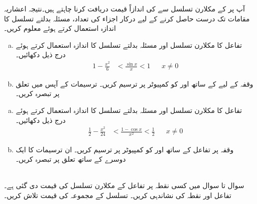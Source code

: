 آپ  پر  کے مکلارن تسلسل سے  کی اندازاً قیمت دریافت کرنا چاہتے ہیں۔نتیجہ  اعشاریہ مقامات تک درست حاصل کرنے کے لیے درکار اجزاء کی تعداد، مسئلہ بدلتے تسلسل کا اندازہ استعمال کرتے ہوئے معلوم کریں۔ 
\begin{enumerate}[a.]
\item
تفاعل  کا مکلارن تسلسل اور مسئلہ بدلتے تسلسل کا اندازہ استعمال کرتے ہوئے درج ذیل دکھائیں۔
\begin{align*}
1-\frac{x^2}{6}&<\frac{\sin x}{x}<1&&x\ne 0
\end{align*}
\item
وقفہ  کے لیے  کے ساتھ  اور  کو کمپیوٹر پر ترسیم کریں۔ ترسیمات کے آپس میں تعلق پر تبصرہ کریں۔
\end{enumerate}
\begin{enumerate}[a.]
\item
تفاعل  کا مکلارن تسلسل اور مسئلہ بدلتے تسلسل کا اندازہ استعمال کرتے ہوئے درج ذیل دکھائیں۔
\begin{align*}
\frac{1}{2}-\frac{x^2}{24}&<\frac{1-\cos x}{x^2}<\frac{1}{2}&&x\ne 0
\end{align*}
\item
وقفہ  پر تفاعل  کے ساتھ  اور  کو کمپیوٹر پر ترسیم کریں۔ ان ترسیمات کا ایک دوسرے کے ساتھ تعلق پر تبصرہ کریں۔
\end{enumerate}
\\
سوال  تا سوال  میں کسی نقطہ پر تفاعل  کے مکلارن تسلسل کی قیمت دی گئی ہے۔ تفاعل اور نقطہ کی نشاندہی کریں۔ تسلسل کے مجموعہ کی قیمت تلاش کریں۔

